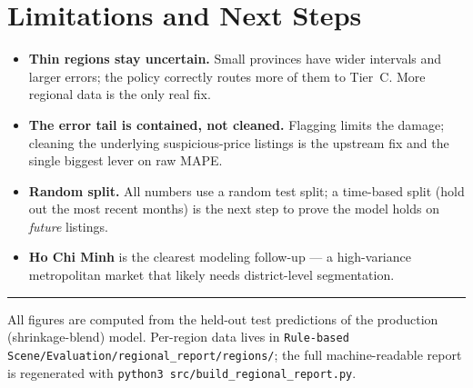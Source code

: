 \documentclass[11pt]{article}
\begin{document}
\section{Limitations and Next Steps}
\begin{itemize}
  \item \textbf{Thin regions stay uncertain.} Small provinces have wider intervals and larger errors;
        the policy correctly routes more of them to Tier~C. More regional data is the only real fix.
  \item \textbf{The error tail is contained, not cleaned.} Flagging limits the damage; cleaning the
        underlying suspicious-price listings is the upstream fix and the single biggest lever on raw
        MAPE.
  \item \textbf{Random split.} All numbers use a random test split; a time-based split (hold out the
        most recent months) is the next step to prove the model holds on \emph{future} listings.
  \item \textbf{Ho Chi Minh} is the clearest modeling follow-up --- a high-variance metropolitan
        market that likely needs district-level segmentation.
\end{itemize}

\vspace{1em}
\hrule
\vspace{0.5em}
\noindent\footnotesize All figures are computed from the held-out test predictions of the production
(shrinkage-blend) model. Per-region data lives in \texttt{Rule-based Scene/Evaluation/regional\_report/regions/};
the full machine-readable report is regenerated with \texttt{python3 src/build\_regional\_report.py}.
\end{document}
